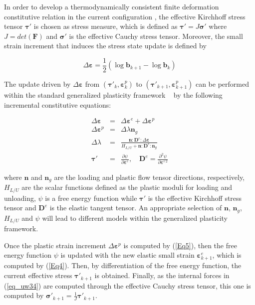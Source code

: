 \documentclass[preprint,12pt,a4paper]{elsarticle}
\begin{document}
In order to develop a thermodynamically consistent finite deformation constitutive relation in the current configuration \cite{Borja1998}, the effective Kirchhoff stress tensor $\boldsymbol{\tau}'$ is chosen as stress measure, which is defined as $\boldsymbol{\tau}'=J \boldsymbol{\sigma}'$ where $J=det(\mathbf{F})$ and $\boldsymbol{\sigma}'$ is the effective Cauchy stress tensor. Moreover, the small strain increment that induces the stress state update is defined by 

\begin{equation}
\Delta \boldsymbol{\varepsilon}= \frac{1}{2} (\log\mathbf{b}_{k+1}-\log\mathbf{b}_{k})  
\end{equation}\label{Eq_B_tr}

The update driven by $\Delta \boldsymbol{\varepsilon}$  from $( \boldsymbol{\tau}'_k, \boldsymbol{\varepsilon}^p_k)$ to $( \boldsymbol{\tau}'_{k+1}, \boldsymbol{\varepsilon}^p_{k+1})$ can be performed within the standard generalized plasticity framework ~\cite{Mira2009} by the following incremental constitutive equations:

\begin{eqnarray}
\Delta\boldsymbol{\varepsilon} &=& \Delta\boldsymbol{\varepsilon}^e+\Delta\boldsymbol{\varepsilon}^p\label{Eq4}\\ 
\Delta\boldsymbol{\varepsilon}^p &=& \Delta \lambda \boldsymbol{n}_g\label{Eq5}\\ 
\Delta \lambda &=& \frac{\boldsymbol{n}:\boldsymbol{D}^e: \Delta \boldsymbol{\varepsilon}}{H_{L/U}+\boldsymbol{n}:\boldsymbol{D}^e:\boldsymbol{n}_g}\label{Eq6}\\
\boldsymbol\tau' &=& \frac{\partial \psi}{\partial \boldsymbol{\varepsilon}^e}, \quad \boldsymbol{D}^e = \frac{\partial^2 \psi}{\partial \boldsymbol{\varepsilon}^{e \, 2}} \label{Eq7}
\end{eqnarray}

where $ \boldsymbol{n}$ and $ \boldsymbol{n}_g$ are the loading and plastic flow tensor directions, respectively, $H_{L/U}$ are the scalar functions defined as the plastic moduli for loading and unloading, $\psi$ is a free energy function while $\boldsymbol{\tau}'$ is the effective Kirchhoff stress tensor and $\boldsymbol{D}^e$ is the elastic tangent tensor. An appropriate selection of $ \boldsymbol{n}$, $ \boldsymbol{n}_g$, $H_{L/U}$ and $\psi$ will lead to different models within the generalized plasticity framework.

Once the plastic strain increment   $\Delta\boldsymbol{\varepsilon}^p$ is computed by (\ref{Eq5}), then the free energy function $\psi$ is updated with the new elastic small strain $\boldsymbol{\varepsilon}^e_{k+1}$, which is computed by (\ref{Eq4}). Then, by differentiation of the free energy function, the current effective stress $\boldsymbol{\tau}'_{k+1}$ is obtained. Finally, as the internal forces in (\ref{eq_uw34}) are computed through the effective Cauchy stress tensor, this one is computed by $\boldsymbol{\sigma}'_{k+1}= \frac{1}{J}\boldsymbol{\tau}'_{k+1}$.
\end{document}

